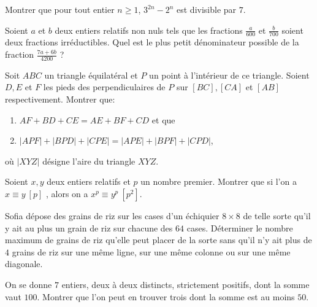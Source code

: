 




\begin{exo}{} 
Montrer que pour tout entier $n \geq 1$, $3^{2n}-2^n$ est divisible par $7$.
\end{exo}

\begin{exo}{}
Soient $a$ et $b$ deux entiers relatifs non nuls tels que les fractions $\frac{a}{600}$ et $\frac{b}{700}$ soient deux fractions irréductibles. Quel est le plus petit dénominateur possible de la fraction $\frac{7a+6b}{4200}$ ?
\end{exo}


\begin{exo}{}
Soit $ABC$ un triangle équilatéral et $P$ un point à l'intérieur de ce triangle. Soient $D,E$ et $F$ les pieds des perpendiculaires de $P$ sur $[BC],[CA]$ et $[AB]$ respectivement. Montrer que:
\begin{enumerate}
\item $AF+BD+CE=AE+BF+CD$ et que
\item $|APF|+|BPD|+|CPE|=|APE|+|BPF|+|CPD|$,
\end{enumerate}
où $|XYZ|$ désigne l'aire du triangle $XYZ$.
\end{exo}

\begin{exo}{}
Soient $x,y$ deux entiers relatifs et $p$ un nombre premier. Montrer que si l'on a $x\equiv y \ [p]$ , alors on a $x^p\equiv y^p \ [p^2]$.
\end{exo}


\begin{exo}{}
Sofia dépose des grains de riz sur les cases d'un échiquier $8\times8$ de telle sorte qu'il y ait au plus un grain de riz sur chacune des $64$ cases. Déterminer le nombre maximum de grains de riz qu'elle peut placer de la sorte sans qu'il n'y ait plus de $4$ grains de riz sur une même ligne, sur une même colonne ou sur une même diagonale.
\end{exo}

\begin{exo}{}
On se donne $7$ entiers, deux à deux distincts, strictement positifs, dont la somme vaut $100$. Montrer que l'on peut en trouver trois dont la somme est au moins $50$.
\end{exo}

